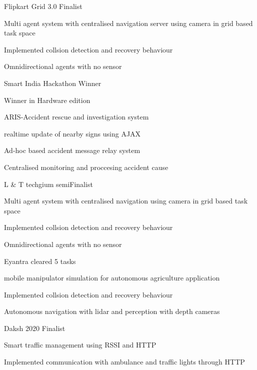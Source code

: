 
\begin{cventries}
	\cventry
	{} %
	{Flipkart Grid 3.0} %
	{Finalist} %
	{} %
	{
		\begin{cvitems} %
			\item {Multi agent system with centralised navigation server using camera in grid based task space}
			\item {Implemented collsion detection and recovery behaviour}
			\item {Omnidirectional agents with no sensor}
		\end{cvitems}
	}
	\cventry
	{} %
	{Smart India Hackathon} %
	{Winner} %
	{} %
	{
		\begin{cvitems} %
			\item {Winner in Hardware edition}
			\item {ARIS-Accident rescue and investigation system}
			\item {realtime update of nearby signs using AJAX}
			\item {Ad-hoc based accident message relay system}
			\item {Centralised monitoring and proccesing accident cause}
		\end{cvitems}
	}
	\cventry
	{} %
	{L \& T techgium} %
	{semi\-Finalist} %
	{} %
	{
		\begin{cvitems} %
			\item {Multi agent system with centralised navigation using camera in grid based task space}
			\item {Implemented collsion detection and recovery behaviour}
			\item {Omnidirectional agents with no sensor}
		\end{cvitems}
	}
	\cventry
	{} %
	{Eyantra} %
	{cleared 5 tasks} %
	{} %
	{
		\begin{cvitems} %
			\item {mobile manipulator simulation for autonomous agriculture application}
			\item {Implemented collsion detection and recovery behaviour}
			\item {Autonomous navigation with lidar and perception with depth cameras}
		\end{cvitems}
	}
	\cventry
	{} %
	{Daksh 2020} %
	{Finalist} %
	{} %
	{
		\begin{cvitems} %
			\item {Smart traffic management using RSSI and HTTP}
			\item {Implemented communication with ambulance and traffic lights through HTTP}
		\end{cvitems}
	}
\end{cventries}
